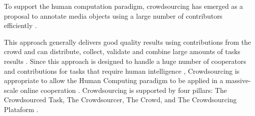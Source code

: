 
To support the human computation paradigm, crowdsourcing has emerged as a proposal to annotate media objects using a large number of contributors efficiently \cite{VonAhn:2005:HC:1168246}. 

This approach generally delivers good quality results using contributions from the crowd and can distribute, collect, validate and combine large amounts of tasks results \cite{Mo:2013:OPH:2505515.2505755}. Since this approach is designed to handle a huge number of cooperators and contributions for tasks that require human intelligence \cite{Howe2006}, Crowdsourcing is appropriate to allow the Human Computing paradigm to be applied in a massive-scale online cooperation \cite{TEDMassive}. Crowdsourcing  is supported by four pillars:  The Crowdsourced Task, The Crowdsourcer, The Crowd, and The Crowdsourcing Plataform \cite{6861072}.

